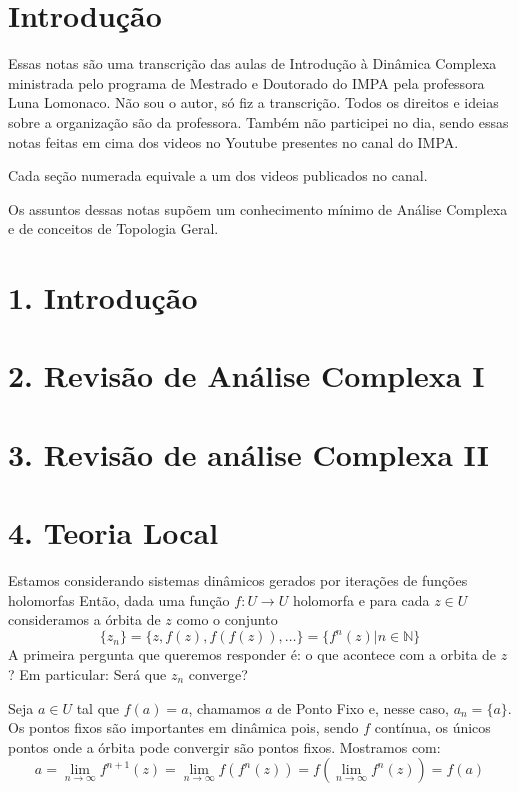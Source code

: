 \documentclass{article}
\begin{document}
\section*{Introdução}


Essas notas são uma transcrição das aulas de Introdução à Dinâmica Complexa ministrada pelo programa de Mestrado e Doutorado do IMPA pela professora Luna Lomonaco.
Não sou o autor, só fiz a transcrição. Todos os direitos e ideias sobre a organização são da professora.
Também não participei no dia, sendo essas notas feitas em cima dos videos no Youtube presentes no canal do IMPA.

Cada seção numerada equivale a um dos videos publicados no canal.

Os assuntos dessas notas supõem um conhecimento mínimo de Análise Complexa e de conceitos de Topologia Geral.

\section*{1. Introdução}

\section*{2. Revisão de Análise Complexa I}

\section*{3. Revisão de análise Complexa II}

\section*{4. Teoria Local}

Estamos considerando sistemas dinâmicos gerados por iterações de funções holomorfas
Então, dada uma função $f: U \to U$ holomorfa e para cada $z \in U$ consideramos a órbita de $z$ como o conjunto $$\{ z_n \} = \{ z, f(z), f(f(z)), \dots \} = \{ f^n(z) | n \in \mathbb{N} \}$$
A primeira pergunta que queremos responder é: o que acontece com a orbita de $z$? Em particular: Será que $z_n$ converge?

Seja $a \in U$ tal que $f(a) = a$, chamamos $a$ de Ponto Fixo e, nesse caso, $a_n = \{ a \}$. Os pontos fixos são importantes em dinâmica pois, sendo $f$ contínua, os únicos pontos onde a órbita pode convergir são pontos fixos. Mostramos com: $$a = \lim_{n \to \infty} f^{n+1}(z) = \lim_{n \to \infty} f(f^n(z)) = f(\lim_{n \to \infty} f^n(z)) = f(a) $$
\end{document}
